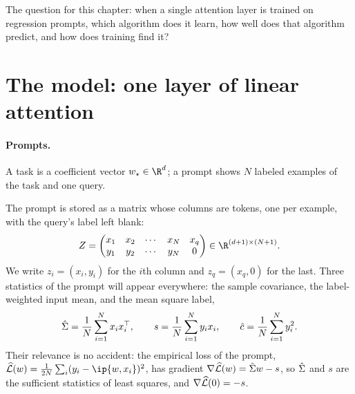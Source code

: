 \begin{refsection}
The question for this chapter: when a single attention layer is trained on regression prompts, which algorithm does it learn, how well does that algorithm predict, and how does training find it?

\section{The model: one layer of linear attention}\label{sec:icl:model}

\paragraph{Prompts.} A task is a coefficient vector $w_\star\in\R^d$; a prompt shows $N$ labeled examples of the task and one query.


The prompt is stored as a matrix whose columns are tokens, one per example, with the query's label left blank:
\begin{equation}\label{eq:icl:Z}
  Z=\begin{pmatrix} x_1 & x_2 & \cdots & x_N & x_q\\ y_1 & y_2 & \cdots & y_N & 0\end{pmatrix}\in\R^{(d+1)\times(N+1)} .
\end{equation}
We write $z_i=(x_i,y_i)$ for the $i$th column and $z_q=(x_q,0)$ for the last. Three statistics of the prompt will appear everywhere: the sample covariance, the label-weighted input mean, and the mean square label,
\[
  \hat\Sigma=\frac1N\sum_{i=1}^Nx_ix_i^\top,\qquad s=\frac1N\sum_{i=1}^Ny_ix_i,\qquad \hat c=\frac1N\sum_{i=1}^Ny_i^2 .
\]
Their relevance is no accident: the empirical loss of the prompt, $\Lhat(w)=\frac1{2N}\sum_i(y_i-\ip{w,x_i})^2$, has gradient $\nabla\widehat{\mathcal{L}}(w)=\hat\Sigma w-s$, so $\hat\Sigma$ and $s$ are the sufficient statistics of least squares, and $\nabla\widehat{\mathcal{L}}(0)=-s$.


\end{refsection}
